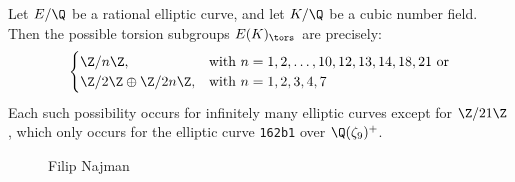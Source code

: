 \begin{frame}[plain]
\begin{thm}[Najman, 2015]
Let $E/\Q$ be a rational elliptic curve, and let $K/\Q$ be a cubic number field. Then the possible torsion subgroups $E(K)_\tors$ are precisely:
	\[
	\begin{cases}
	\Z/n\Z, & \text{with } n= 1, 2, \ldots, 10, 12, 13, 14, 18, 21 \text{ or} \\
	\Z/2\Z \oplus \Z/2n\Z, & \text{with } n= 1, 2, 3, 4, 7
	\end{cases}
	\]
Each such possibility occurs for infinitely many elliptic curves except for $\Z/21\Z$, which only occurs for the elliptic curve \texttt{162b1} over $\Q(\zeta_9)^+$.
\end{thm}
	\begin{figure}[!ht]
	\centering
	\captionsetup{labelformat=empty}
	\caption{Filip Najman}
	\end{figure}
\end{frame}





